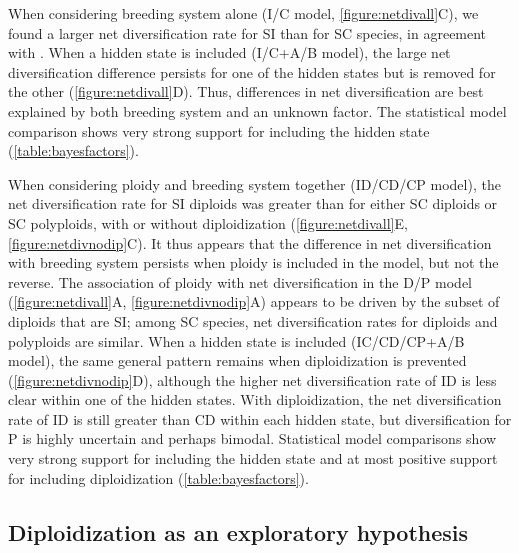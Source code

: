 When considering breeding system alone (I/C model, \cref{figure:netdivall}C), we found a larger net diversification rate for SI than for SC species, in agreement with \citet{goldberg_2010}. %
When a hidden state is included (I/C+A/B model), the large net diversification difference persists for one of the hidden states but is removed for the other (\cref{figure:netdivall}D).
Thus, differences in net diversification are best explained by both breeding system and an unknown factor.
The statistical model comparison shows very strong support for including the hidden state (\cref{table:bayesfactors}).

When considering ploidy and breeding system together (ID/CD/CP model), the net diversification rate for SI diploids was greater than for either SC diploids or SC polyploids, with or without diploidization (\cref{figure:netdivall}E, \cref{figure:netdivnodip}C).
It thus appears that the difference in net diversification with breeding system persists when ploidy is included in the model, but not the reverse.
The association of ploidy with net diversification in the D/P model (\cref{figure:netdivall}A, \cref{figure:netdivnodip}A) appears to be driven by the subset of diploids that are SI; among SC species, net diversification rates for diploids and polyploids are similar.
%
When a hidden state is included (IC/CD/CP+A/B model), the same general pattern remains when diploidization is prevented (\cref{figure:netdivnodip}D), although the higher net diversification rate of ID is less clear within one of the hidden states.
With diploidization, the net diversification rate of ID is still greater than CD within each hidden state, but diversification for P is highly uncertain and perhaps bimodal.
Statistical model comparisons show very strong support for including the hidden state and at most positive support for including diploidization (\cref{table:bayesfactors}).


\subsection{Diploidization as an exploratory hypothesis}

